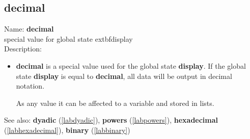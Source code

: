 \subsection{decimal}
\label{labdecimal}
\noindent Name: \textbf{decimal}\\
special value for global state 	extbf{display}\\
\noindent Description: \begin{itemize}

\item \textbf{decimal} is a special value used for the global state \textbf{display}.
   If the global state \textbf{display} is equal to \textbf{decimal}, all data will
   be output in decimal notation.
    
   As any value it can be affected to a variable and stored in lists.
\end{itemize}
See also: \textbf{dyadic} (\ref{labdyadic}), \textbf{powers} (\ref{labpowers}), \textbf{hexadecimal} (\ref{labhexadecimal}), \textbf{binary} (\ref{labbinary})
